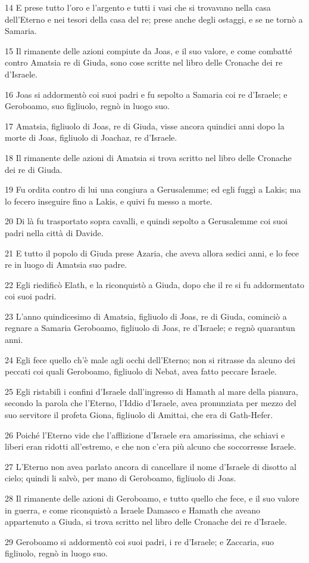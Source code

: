 \par 14 E prese tutto l'oro e l'argento e tutti i vasi che si trovavano nella casa dell'Eterno e nei tesori della casa del re; prese anche degli ostaggi, e se ne tornò a Samaria.
\par 15 Il rimanente delle azioni compiute da Joas, e il suo valore, e come combatté contro Amatsia re di Giuda, sono cose scritte nel libro delle Cronache dei re d'Israele.
\par 16 Joas si addormentò coi suoi padri e fu sepolto a Samaria coi re d'Israele; e Geroboamo, suo figliuolo, regnò in luogo suo.
\par 17 Amatsia, figliuolo di Joas, re di Giuda, visse ancora quindici anni dopo la morte di Joas, figliuolo di Joachaz, re d'Israele.
\par 18 Il rimanente delle azioni di Amatsia si trova scritto nel libro delle Cronache dei re di Giuda.
\par 19 Fu ordita contro di lui una congiura a Gerusalemme; ed egli fuggì a Lakis; ma lo fecero inseguire fino a Lakis, e quivi fu messo a morte.
\par 20 Di là fu trasportato sopra cavalli, e quindi sepolto a Gerusalemme coi suoi padri nella città di Davide.
\par 21 E tutto il popolo di Giuda prese Azaria, che aveva allora sedici anni, e lo fece re in luogo di Amatsia suo padre.
\par 22 Egli riedificò Elath, e la riconquistò a Giuda, dopo che il re si fu addormentato coi suoi padri.
\par 23 L'anno quindicesimo di Amatsia, figliuolo di Joas, re di Giuda, cominciò a regnare a Samaria Geroboamo, figliuolo di Joas, re d'Israele; e regnò quarantun anni.
\par 24 Egli fece quello ch'è male agli occhi dell'Eterno; non si ritrasse da alcuno dei peccati coi quali Geroboamo, figliuolo di Nebat, avea fatto peccare Israele.
\par 25 Egli ristabilì i confini d'Israele dall'ingresso di Hamath al mare della pianura, secondo la parola che l'Eterno, l'Iddio d'Israele, avea pronunziata per mezzo del suo servitore il profeta Giona, figliuolo di Amittai, che era di Gath-Hefer.
\par 26 Poiché l'Eterno vide che l'afflizione d'Israele era amarissima, che schiavi e liberi eran ridotti all'estremo, e che non c'era più alcuno che soccorresse Israele.
\par 27 L'Eterno non avea parlato ancora di cancellare il nome d'Israele di disotto al cielo; quindi li salvò, per mano di Geroboamo, figliuolo di Joas.
\par 28 Il rimanente delle azioni di Geroboamo, e tutto quello che fece, e il suo valore in guerra, e come riconquistò a Israele Damasco e Hamath che aveano appartenuto a Giuda, si trova scritto nel libro delle Cronache dei re d'Israele.
\par 29 Geroboamo si addormentò coi suoi padri, i re d'Israele; e Zaccaria, suo figliuolo, regnò in luogo suo.

